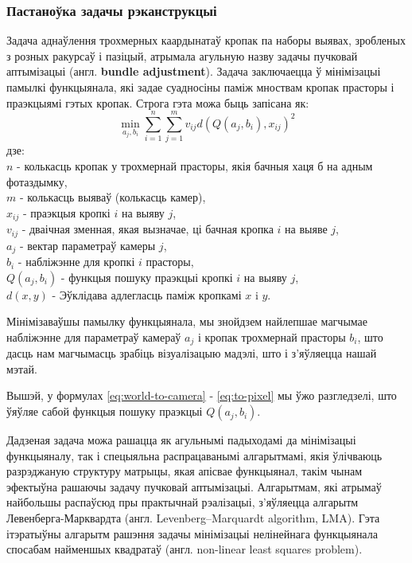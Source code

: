 \subsubsection*{Пастаноўка задачы рэканструкцыі}
Задача аднаўлення трохмерных каардынатаў кропак па наборы выявах, зробленых з розных ракурсаў і пазіцый, атрымала агульную назву задачы пучковай аптымізацыі (англ. {\bf bundle adjustment}). Задача заключаецца ў мінімізацыі памылкі функцыянала, які задае суадносіны паміж мноствам кропак прасторы і праэкцыямі гэтых кропак. Строга гэта можа быць запісана як:
\begin{equation} \label{eq:bundle-adjustment}
    \min_{a_j, b_i} \sum_{i=1}^{n} \sum_{j=1}^{m} v_{ij}d(Q(a_j, b_i), x_{ij})^2
\end{equation}
дзе:\\
$n$ - колькасць кропак у трохмернай прасторы, якія бачныя хаця б на адным фотаздымку,\\
$m$ - колькасць выяваў (колькасць камер),\\
$x_{ij}$ - праэкцыя кропкі $i$ на выяву $j$,\\
$v_{ij}$ - дваічная зменная, якая вызначае, ці бачная кропка $i$ на выяве $j$,\\
$a_{j}$ - вектар параметраў камеры $j$,\\
$b_{i}$ - набліжэнне для кропкі $i$ прасторы,\\
$Q(a_j, b_i)$ - функцыя пошуку праэкцыі кропкі $i$ на выяву $j$,\\
$d(x, y)$ - Эўклідава адлегласць паміж кропкамі $x$ i $y$.\par
Мінімізаваўшы памылку функцыянала, мы знойдзем найлепшае магчымае набліжэнне для параметраў камераў $a_{j}$ і кропак трохмернай прасторы $b_{i}$, што дасць нам магчымасць зрабіць візуалізацыю мадэлі, што і з'яўляецца нашай мэтай.\par
Вышэй, у формулах \eqref{eq:world-to-camera} - \eqref{eq:to-pixel} мы ўжо разгледзелі, што ўяўляе сабой функцыя пошуку праэкцыі $Q(a_j, b_i)$.\par
Дадзеная задача можа рашацца як агульнымі падыходамі да мінімізацыі функцыяналу, так і спецыяльна распрацаванымі алгарытмамі, якія ўлічваюць разрэджаную структуру матрыцы, якая апісвае функцыянал, такім чынам эфектыўна рашаючы задачу пучковай аптымізацыі. Алгарытмам, які атрымаў найбольшы распаўсюд пры практычнай рэалізацыі, з'яўляецца алгарытм Левенберга-Марквардта (англ. Levenberg–Marquardt algorithm, LMA). Гэта ітэратыўны алгарытм рашэння задачы мінімізацыі нелінейнага функцыянала спосабам найменшых квадратаў (англ.  non-linear least squares problem).

